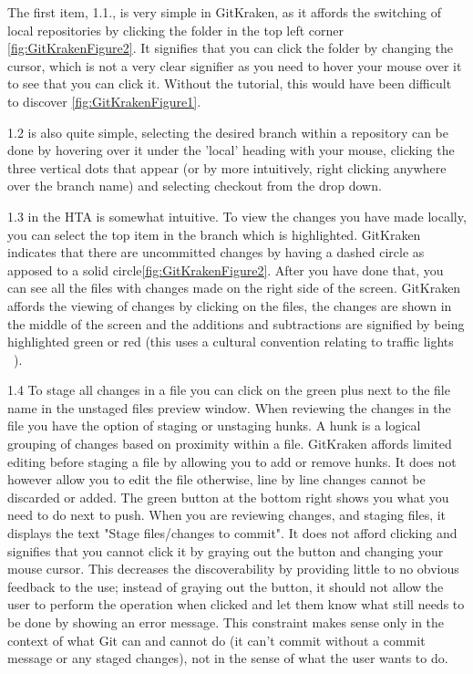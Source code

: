 \documentclass{sigchi}
\begin{document}
The first item, 1.1., is very simple in GitKraken, as it affords the switching of local repositories by clicking the folder
 in the top left corner \ref{fig:GitKrakenFigure2}. It signifies that you can click the folder by changing the cursor, which is not a very clear signifier 
as you need to hover your mouse over it to see that you can click it. Without the tutorial, this would have been difficult to discover \ref{fig:GitKrakenFigure1}.

1.2 is also quite simple, selecting the desired branch within a repository can be done by hovering over it under the 
'local' heading with your mouse, clicking the three vertical dots that appear (or by more intuitively, right clicking anywhere over the branch name) 
and selecting checkout from the drop down.

1.3 in the HTA is somewhat intuitive. To view the changes you have made locally, you can select the top item in
the branch which is highlighted. GitKraken indicates that there are uncommitted changes by having a dashed circle as apposed to a solid circle\ref{fig:GitKrakenFigure2}.
After you have done that, you can see all the files with changes made on the right side of the screen.
GitKraken affords the viewing of changes by clicking on the files, the changes are shown in the middle of the screen and the additions and subtractions are signified by being highlighted green or red (this uses a cultural convention relating to traffic lights ~\cite{Norman:2013}). 

1.4 To stage all changes in a file you can click on the green plus next to the file name in the unstaged files preview window. When reviewing the changes in the file you have the option of staging or unstaging hunks. A hunk is a logical grouping of changes based on proximity within a file. GitKraken affords limited editing before staging a file by allowing you to add or remove hunks. It does not however allow you to edit the file otherwise, line by line changes cannot be discarded or added.
The green button at the bottom right shows you what you need to do next to push. When you are reviewing changes, and staging files, it displays the text "Stage files/changes to commit". It does not afford clicking and signifies that you cannot click it by graying out the button and changing your mouse cursor. This decreases the discoverability by providing little to no obvious feedback to the use; instead of graying out the button, it should not allow the user to perform the operation when clicked and let them know what still needs to be done by showing an error message. This constraint makes sense only in the context of what Git can and cannot do (it can't commit without a commit message or any staged changes), not in the sense of what the user wants to do.
\end{document}
